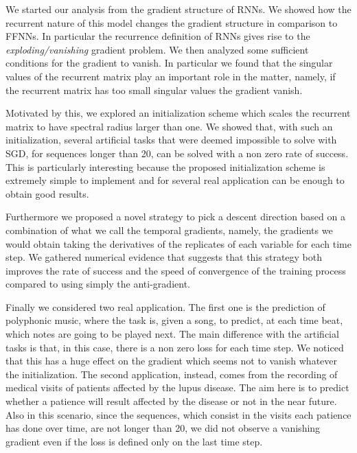 We started our analysis from the gradient structure of RNNs. We showed how the recurrent nature of this model changes the gradient structure in comparison to FFNNs. In particular the recurrence definition of RNNs gives rise to the \textit{exploding/vanishing} gradient problem. We then analyzed some sufficient conditions for the gradient to vanish. In particular we found that the singular values of the recurrent matrix play an important role in the matter, namely, if the recurrent matrix has too small singular values the gradient vanish.

Motivated by this, we explored an initialization scheme which scales the recurrent matrix to have spectral radius larger than one. We showed that, with such an initialization, several artificial tasks that were deemed impossible to solve with SGD, for sequences longer than 20, can be solved with a non zero rate of success. This is particularly interesting because the proposed initialization scheme is extremely simple to implement and for several real application can be enough to obtain good results. 

Furthermore we proposed a novel strategy to pick a descent direction based on a combination of what we call the temporal gradients, namely, the gradients we would obtain taking the derivatives of the replicates of each variable for each time step.
We gathered numerical evidence that suggests that this strategy both improves the rate of success and the speed of convergence of the training process compared to using simply the anti-gradient.

Finally we considered two real application. The first one is the prediction of polyphonic music, where the task is, given a song, to predict, at each time beat, which notes are going to be played next. The main difference with the artificial tasks is that, in this case, there is a non zero loss for each time step. We noticed that this has a huge effect on the gradient which seems not to vanish whatever the initialization. The second application, instead, comes from the recording of medical visits of patients affected by the lupus disease. The aim here is to predict whether a patience will result affected by the disease or not in the near future. Also in this scenario, since the sequences, which consist in the visits each patience has done over time, are not longer than 20, we did not observe a vanishing gradient even if the loss is defined only on the last time step. 
